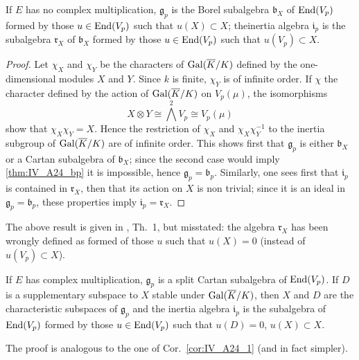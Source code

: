 \begin{subappendices}
\begin{cor}\label{cor:IV_A24_1}
If $E$ has no complex multiplication, $\mathfrak{g}_p$ is the Borel subalgebra
$\mathfrak{b}_X$ of $\operatorname{End}(V_p)$ formed by those $u \in \operatorname{End}(V_p)$ such that
$u(X) \subset X$; the\break inertia algebra $\mathfrak{i}_p$ is the subalgebra
$\mathfrak{r}_X$ of $\mathfrak{b}_X$ formed by those $u \in \operatorname{End}(V_p)$ such
that $u(V_p) \subset X$.
\end{cor}
\begin{proof}
Let $\chi_X$ and $\chi_Y$ be the characters of $\operatorname{Gal}(\overline{K}/K)$ defined by
the one-dimensional modules $X$ and $Y$. Since $k$ is finite, $\chi_Y$ is
of infinite order. If $\chi$ the character defined by the action of
$\operatorname{Gal}(\overline{K}/K)$ on $V_p(\mu)$, the isomorphisms
\[
	X \otimes Y \cong \bigwedge^2 V_p \cong V_p(\mu)
\]
show that $\chi_X \chi_Y = X$.
Hence the restriction of $\chi_X$ and $\chi_X\chi_Y^{-1}$ to the inertia
subgroup of $\operatorname{Gal}(\overline{K}/K)$ are of infinite order. This shows
first that $\mathfrak{g}_p$ is either $\mathfrak{b}_X$ or a Cartan subalgebra
of $\mathfrak{b}_X$; since the second case would imply \ref{thm:IV_A24_bp} it
is impossible, hence $\mathfrak{g}_p = \mathfrak{b}_p$.
Similarly, one sees first that $\mathfrak{i}_p$ is contained in
$\mathfrak{r}_X$, then that its action on $X$ is non trivial; since it is an
ideal in $\mathfrak{g}_p = \mathfrak{b}_p$, these properties imply
$\mathfrak{i}_p = \mathfrak{r}_X$.
\end{proof}

\begin{obs}
The above result is given in \cite[245]{25}, Th.~1, but 
misstated: the algebra $\mathfrak{r}_X$ has been wrongly defined as formed of
those $u$ such that $u(X) = 0$ (instead of $u(V_p) \subset X$).
\end{obs}

\begin{cor}
If $E$ has complex multiplication, $\mathfrak{g}_p$ is a split Cartan
subalgebra of $\operatorname{End}(V_p)$. If $D$ is a supplementary subspace to $X$ stable
under $\operatorname{Gal}(\overline{K}/K)$, then $X$ and $D$ are the characteristic subspaces of
$\mathfrak{g}_p$ and the inertia algebra $\mathfrak{i}_p$ is the subalgebra of
$\operatorname{End}(V_p)$ formed by those $u \in \operatorname{End}(V_p)$ such that $u(D) = 0$, $u(X)
\subset X$.
\end{cor}
The proof is analogous to the one of Cor.~\ref{cor:IV_A24_1} (and in fact simpler).

\end{subappendices}
